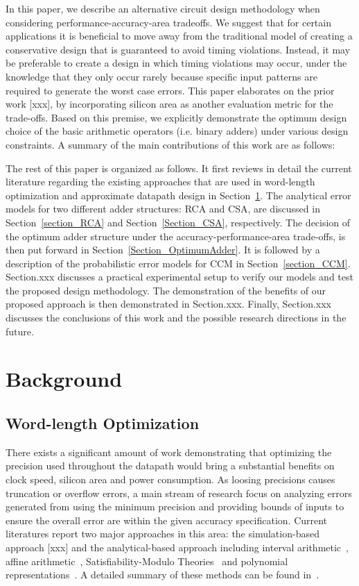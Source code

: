 \documentclass[journal]{IEEEtran}
\begin{document}
In this paper, we describe an alternative circuit design methodology when considering performance-accuracy-area tradeoffs. We suggest that for certain applications it is beneficial to move away from the traditional model of creating a conservative design that is guaranteed to avoid timing violations. Instead, it may be preferable to create a design in which timing violations may occur, under the knowledge that they only occur rarely because specific input patterns are required to generate the worst case errors. This paper elaborates on the prior work [xxx], by incorporating silicon area as another evaluation metric for the trade-offs. Based on this premise, we explicitly demonstrate the optimum design choice of the basic arithmetic operators (i.e. binary adders) under various design constraints. A summary of the main contributions of this work are as follows:

The rest of this paper is organized as follows. It first reviews in detail the current literature regarding the existing approaches that are used in word-length optimization and approximate datapath design in Section~\ref{Section_Background}. The analytical error models for two different adder structures: RCA and CSA, are discussed in Section~\ref{section_RCA} and Section~\ref{Section_CSA}, respectively. The decision of the optimum adder structure under the accuracy-performance-area trade-offs, is then put forward in Section~\ref{Section_OptimumAdder}. It is followed by a description of the probabilistic error models for CCM in Section~\ref{section_CCM}. Section.xxx discusses a practical experimental setup to verify our models and test the proposed design methodology. The demonstration of the benefits of our proposed approach is then demonstrated in Section.xxx. Finally, Section.xxx discusses the conclusions of this work and the possible research directions in the future.

\section{Background}\label{Section_Background}
\subsection{Word-length Optimization}\label{Section_Background_WL}
There exists a significant amount of work demonstrating that optimizing the precision used throughout the datapath would bring a substantial benefits on clock speed, silicon area and power consumption. As loosing precisions causes truncation or overflow errors, a main stream of research focus on analyzing errors generated from using the minimum precision and providing bounds of inputs to ensure the overall error are within the given accuracy specification. Current literatures report two major approaches in this area: the simulation-based approach [xxx] and the analytical-based approach including interval arithmetic~\cite{moore1966IA}, affine arithmetic~\cite{de2004affine}, Satisfiability-Modulo Theories~\cite{SAT2010} and polynomial representations~\cite{Boland2011TCAD}. A detailed summary of these methods can be found in~\cite{GeorgeDT11, lee2006accuracy}.
\end{document}
